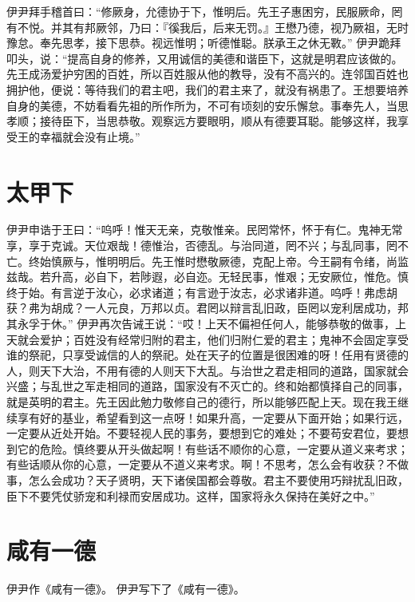 \documentclass[a4paper,12pt,UTF8,twoside]{ctexbook}
\begin{document}
伊尹拜手稽首曰：“修厥身，允德协于下，惟明后。先王子惠困穷，民服厥命，罔有不悦。并其有邦厥邻，乃曰：『徯我后，后来无罚。』王懋乃德，视乃厥祖，无时豫怠。奉先思孝，接下思恭。视远惟明；听德惟聪。朕承王之休无斁。”
伊尹跪拜叩头，说：“提高自身的修养，又用诚信的美德和谐臣下，这就是明君应该做的。先王成汤爱护穷困的百姓，所以百姓服从他的教导，没有不高兴的。连邻国百姓也拥护他，便说：等待我们的君主吧，我们的君主来了，就没有祸患了。王想要培养自身的美德，不妨看看先祖的所作所为，不可有顷刻的安乐懈怠。事奉先人，当思孝顺；接待臣下，当思恭敬。观察远方要眼明，顺从有德要耳聪。能够这样，我享受王的幸福就会没有止境。”

\chapter{太甲下}

伊尹申诰于王曰：“呜呼！惟天无亲，克敬惟亲。民罔常怀，怀于有仁。鬼神无常享，享于克诚。天位艰哉！德惟治，否德乱。与治同道，罔不兴；与乱同事，罔不亡。终始慎厥与，惟明明后。先王惟时懋敬厥德，克配上帝。今王嗣有令绪，尚监兹哉。若升高，必自下，若陟遐，必自迩。无轻民事，惟艰；无安厥位，惟危。慎终于始。有言逆于汝心，必求诸道；有言逊于汝志，必求诸非道。呜呼！弗虑胡获？弗为胡成？一人元良，万邦以贞。君罔以辩言乱旧政，臣罔以宠利居成功，邦其永孚于休。”
伊尹再次告诫王说：“哎！上天不偏袒任何人，能够恭敬的做事，上天就会爱护；百姓没有经常归附的君主，他们归附仁爱的君主；鬼神不会固定享受谁的祭祀，只享受诚信的人的祭祀。处在天子的位置是很困难的呀！任用有贤德的人，则天下大治，不用有德的人则天下大乱。与治世之君走相同的道路，国家就会兴盛；与乱世之军走相同的道路，国家没有不灭亡的。终和始都慎择自己的同事，就是英明的君主。先王因此勉力敬修自己的德行，所以能够匹配上天。现在我王继续享有好的基业，希望看到这一点呀！如果升高，一定要从下面开始；如果行远，一定要从近处开始。不要轻视人民的事务，要想到它的难处；不要苟安君位，要想到它的危险。慎终要从开头做起啊！有些话不顺你的心意，一定要从道义来考求；有些话顺从你的心意，一定要从不道义来考求。啊！不思考，怎么会有收获？不做事，怎么会成功？天子贤明，天下诸侯国都会尊敬。君主不要使用巧辩扰乱旧政，臣下不要凭仗骄宠和利禄而安居成功。这样，国家将永久保持在美好之中。”

\chapter{咸有一德}

伊尹作《咸有一德》。
伊尹写下了《咸有一德》。
\end{document}
